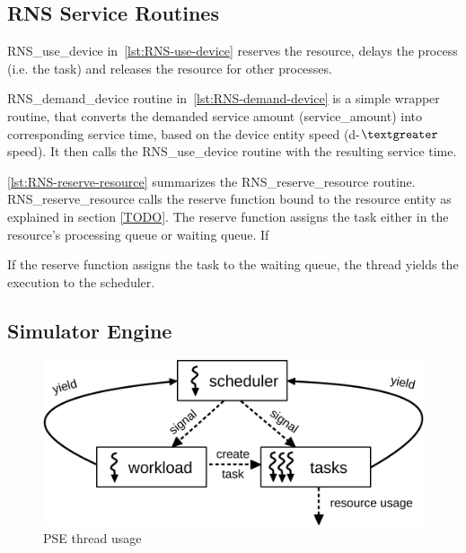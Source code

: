 \subsection{RNS Service Routines}
\label{sec:rns-service-routines}



RNS\_use\_device in~\ref{lst:RNS-use-device} reserves the resource, delays the process (i.e. the task) and releases the resource for other processes.



RNS\_demand\_device routine in~\ref{lst:RNS-demand-device} is a simple wrapper routine, that converts the demanded service amount (service\_amount) into corresponding service time, based on the device entity speed (d-$\textgreater$speed). It then calls the RNS\_use\_device routine with the resulting service time.



\ref{lst:RNS-reserve-resource} summarizes the RNS\_reserve\_resource routine. RNS\_reserve\_resource calls the reserve function bound to the resource entity as explained in section \ref{TODO}. The reserve function assigns the task either in the resource's processing queue or waiting queue. If

If the reserve function assigns the task to the waiting queue, the thread yields the execution to the scheduler.




\subsection{Simulator Engine}
\label{sec:simulator-engine}




\begin{figure}[ht]
  \begin{center}
    \includegraphics[width=\textwidth]{images/rns-threads.pdf}
    \caption{PSE thread usage}
    \label{fig:rns-threads}
  \end{center}
\end{figure}

